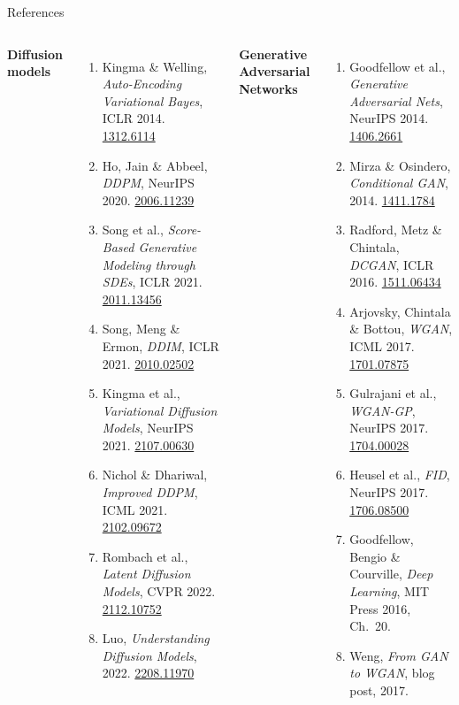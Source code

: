 \documentclass[aspectratio=169,11pt]{beamer}
\begin{document}
\begin{frame}{References}
\begin{columns}[T]
\textbf{Diffusion models}
\begin{enumerate}\footnotesize
  \setlength\itemsep{2pt}
  \item Kingma \& Welling, \emph{Auto-Encoding Variational Bayes},
        ICLR 2014. \href{https://arxiv.org/abs/1312.6114}{1312.6114}
  \item Ho, Jain \& Abbeel, \emph{DDPM},
        NeurIPS 2020. \href{https://arxiv.org/abs/2006.11239}{2006.11239}
  \item Song et al., \emph{Score-Based Generative Modeling through SDEs},
        ICLR 2021. \href{https://arxiv.org/abs/2011.13456}{2011.13456}
  \item Song, Meng \& Ermon, \emph{DDIM},
        ICLR 2021. \href{https://arxiv.org/abs/2010.02502}{2010.02502}
  \item Kingma et al., \emph{Variational Diffusion Models},
        NeurIPS 2021. \href{https://arxiv.org/abs/2107.00630}{2107.00630}
  \item Nichol \& Dhariwal, \emph{Improved DDPM},
        ICML 2021. \href{https://arxiv.org/abs/2102.09672}{2102.09672}
  \item Rombach et al., \emph{Latent Diffusion Models},
        CVPR 2022. \href{https://arxiv.org/abs/2112.10752}{2112.10752}
  \item Luo, \emph{Understanding Diffusion Models},
        2022. \href{https://arxiv.org/abs/2208.11970}{2208.11970}
\end{enumerate}

\textbf{Generative Adversarial Networks}
\begin{enumerate}\footnotesize
  \setlength\itemsep{2pt}
  \item Goodfellow et al., \emph{Generative Adversarial Nets},
        NeurIPS 2014. \href{https://arxiv.org/abs/1406.2661}{1406.2661}
  \item Mirza \& Osindero, \emph{Conditional GAN},
        2014. \href{https://arxiv.org/abs/1411.1784}{1411.1784}
  \item Radford, Metz \& Chintala, \emph{DCGAN},
        ICLR 2016. \href{https://arxiv.org/abs/1511.06434}{1511.06434}
  \item Arjovsky, Chintala \& Bottou, \emph{WGAN},
        ICML 2017. \href{https://arxiv.org/abs/1701.07875}{1701.07875}
  \item Gulrajani et al., \emph{WGAN-GP},
        NeurIPS 2017. \href{https://arxiv.org/abs/1704.00028}{1704.00028}
  \item Heusel et al., \emph{FID},
        NeurIPS 2017. \href{https://arxiv.org/abs/1706.08500}{1706.08500}
  \item Goodfellow, Bengio \& Courville,
        \emph{Deep Learning}, MIT Press 2016, Ch.~20.
  \item Weng, \emph{From GAN to WGAN}, blog post, 2017.
\end{enumerate}
\end{columns}
\end{frame}
\end{document}
